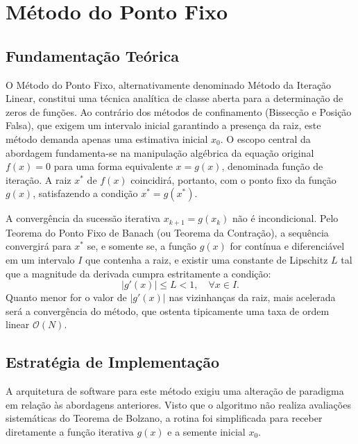 \section{Método do Ponto Fixo}
\label{sec:metodo_ponto_fixo}

\subsection{Fundamentação Teórica}
\label{subsec:fundamentacao_teorica_ponto_fixo}

O Método do Ponto Fixo, alternativamente denominado Método da Iteração Linear, constitui uma técnica analítica de classe aberta para a determinação de zeros de funções. Ao contrário dos métodos de confinamento (Bissecção e Posição Falsa), que exigem um intervalo inicial garantindo a presença da raiz, este método demanda apenas uma estimativa inicial $x_0$. O escopo central da abordagem fundamenta-se na manipulação algébrica da equação original $f(x) = 0$ para uma forma equivalente $x = g(x)$, denominada função de iteração. A raiz $x^*$ de $f(x)$ coincidirá, portanto, com o ponto fixo da função $g(x)$, satisfazendo a condição $x^* = g(x^*)$.

A convergência da sucessão iterativa $x_{k+1} = g(x_k)$ não é incondicional. Pelo Teorema do Ponto Fixo de Banach (ou Teorema da Contração), a sequência convergirá para $x^*$ se, e somente se, a função $g(x)$ for contínua e diferenciável em um intervalo $I$ que contenha a raiz, e existir uma constante de Lipschitz $L$ tal que a magnitude da derivada cumpra estritamente a condição:
\begin{equation}
    |g'(x)| \leq L < 1, \quad \forall x \in I.
    \label{eq:condicao_convergencia_ponto_fixo}
\end{equation}
Quanto menor for o valor de $|g'(x)|$ nas vizinhanças da raiz, mais acelerada será a convergência do método, que ostenta tipicamente uma taxa de ordem linear $\mathcal{O}(N)$.

\subsection{Estratégia de Implementação}
\label{subsec:estrategia_implementacao_ponto_fixo}

A arquitetura de software para este método exigiu uma alteração de paradigma em relação às abordagens anteriores. Visto que o algoritmo não realiza avaliações sistemáticas do Teorema de Bolzano, a rotina foi simplificada para receber diretamente a função iterativa $g(x)$ e a semente inicial $x_0$.

